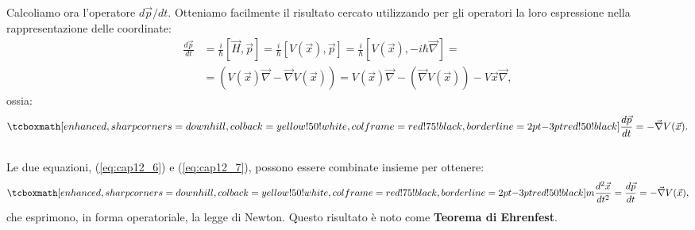 Calcoliamo ora l'operatore ${d\vec{p}}/{dt}$. Otteniamo facilmente il risultato cercato utilizzando per gli operatori la loro espressione nella rappresentazione delle coordinate:\\
	\begin{align}
		\frac{d\vec{p}}{dt}&=\frac{i}{\hbar}[\vec{H},\vec{p}]=\frac{i}{\hbar}[V(\vec{x}),\vec{p}]=  \frac{i}{\hbar}[V(\vec{x}),-i\hbar\vec{\nabla}]= \nonumber \\
		&= (V(\vec{x})\vec{\nabla}-\vec{\nabla}V(\vec{x}))= V(\vec{x})\vec{\nabla}-(\vec{\nabla}V(\vec{x}))-V	\vec{x}\vec{\nabla},
	\end{align}
ossia:
	\begin{equation}
	\label{eq:cap12_7}
		\tcboxmath[enhanced, sharp corners=downhill, colback=yellow!50!white, colframe=red!75!black, borderline={2pt}{-3pt}{red!50!black}]{
			\frac{d\vec{p}}{dt}=-\vec{\nabla}V(\vec{x}).
			}
	\end{equation}\\
	
Le due equazioni, (\ref{eq:cap12_6}) e (\ref{eq:cap12_7}), possono essere combinate insieme per ottenere:\\
	\begin{equation}
		\tcboxmath[enhanced, sharp corners=downhill, colback=yellow!50!white, colframe=red!75!black, borderline={2pt}{-3pt}{red!50!black}]{
			m\frac{d^2\vec{x}}{dt^2}=\frac{d\vec{p}}{dt}=-\vec{\nabla}V(\vec{x}),
			}
	\end{equation}
che esprimono, in forma operatoriale, la legge di Newton. Questo risultato è noto come \textbf{Teorema di Ehrenfest}.
